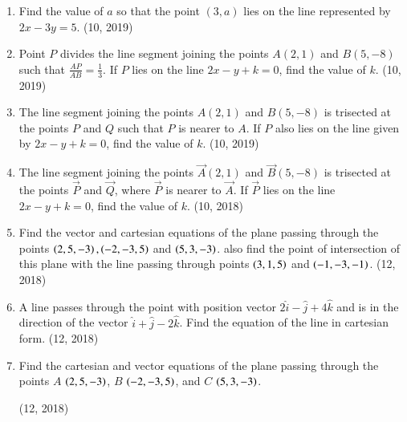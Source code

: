 \begin{enumerate}[label=\thesubsection.\arabic*, ref=\thesubsection.\theenumi]
\item Find the value of $a$ so that the point $(3, a)$ lies on the line represented by $2x - 3y = 5$. \hfill (10, 2019)
\item Point $P$ divides the line segment joining the points $A(2, 1)$ and $B(5, -8)$ such that $\frac{AP}{AB} = \frac{1}{3}$. If $P$ lies on the line $2x - y + k = 0$, find the value of $k$. \hfill (10, 2019)
\item The line segment joining the points $A(2, 1)$ and $B(5, -8)$ is trisected at the points $P$ and $Q$ such that $P$ is nearer to $A$. If $P$ also lies on the line given by $2x - y + k = 0$, find the value of $k$. \hfill (10, 2019)
    \item The line segment joining the points $\vec{A}(2,1)$ and $\vec{B}(5,-8)$ is trisected at the points $\vec{P}$ and $\vec{Q}$, where $\vec{P}$ is nearer to $\vec{A}$. If $\vec{P}$ lies on the line $2x - y + k = 0$, find the value of $k$. \hfill (10, 2018)
\item Find the vector and cartesian equations of the plane passing through the points $\left(2,5,-3\right),\left(-2,-3,5\right)$ and $\left(5,3,-3\right)$. also find the point of intersection of this plane with the line passing through points $\left(3,1,5\right)$ and $\left(-1,-3,-1\right)$.
\hfill (12, 2018)
\item A line passes through the point with position vector $2\hat{i}-\hat{j}+4\hat{k}$ and is in the direction of the vector $\hat{i}+\hat{j}-2\hat{k}$. Find the equation of the line in cartesian form.
\hfill (12, 2018) 
\item Find the cartesian and vector equations of the plane passing through the points $A$ $\left(2, 5, -3\right)$, $B$ $\left(-2, -3, 5\right)$, and $C$ $\left(5, 3, -3\right)$.

\hfill (12, 2018) 
\end{enumerate}
